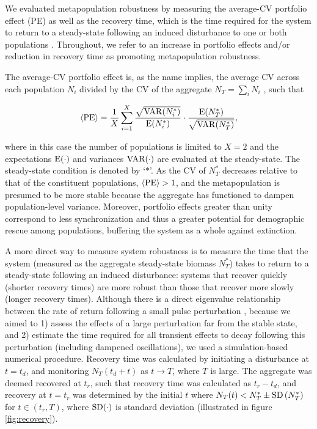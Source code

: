 \documentclass{revtex4}
\begin{document}
\noindent We evaluated metapopulation robustness by measuring the average-CV portfolio effect (PE) \citep{Anderson:2014cx,Schindler:2015gf} as well as the recovery time, which is the time required for the system to return to a steady-state following an induced disturbance to one or both populations \citep{Ovaskainen:2002il}.
Throughout, we refer to an increase in portfolio effects and/or reduction in recovery time as promoting metapopulation robustness.

The average-CV portfolio effect is, as the name implies, the average CV across each population $N_i$ divided by the CV of the aggregate $N_T=\sum_i N_i$ \citep{Anderson:2013gb}, such that

\begin{equation}
\langle{\rm PE}\rangle =\frac{1}{X}\sum_{i=1}^{X} \frac{\sqrt{{\rm VAR}(N_i^*)}}{{\rm E}(N_i^*)}\cdot \frac{{\rm E}(N_T^*)}{\sqrt{{\rm VAR}(N_T^*)}},
\label{eq:pe}
\end{equation}

\noindent where in this case the number of populations is limited to $X=2$ and the expectations $\rm E(\cdot)$ and variances $\rm VAR(\cdot)$ are evaluated at the steady-state.
The steady-state condition is denoted by `$*$'.
As the CV of $N_T^*$ decreases relative to that of the constituent populations, $\langle{\rm PE}\rangle > 1$, and the metapopulation is presumed to be more stable because the aggregate has functioned to dampen population-level variance.
Moreover, portfolio effects greater than unity correspond to less synchronization  \citep{Loreau:2008ju,Anderson:2014cx,Yeakel:2013vz} and thus a greater potential for demographic rescue among populations, buffering the system as a whole against extinction. 

A more direct way to measure system robustness is to measure the time that the system (measured as the aggregate steady-state biomass $N_T^*$) takes to return to a steady-state following an induced disturbance: systems that recover quickly (shorter recovery times) are more robust than those that recover more slowly (longer recovery times).
Although there is a direct eigenvalue relationship between the rate of return following a small pulse perturbation \citep{GuckHolmes}, because we aimed to 
1) assess the effects of a large perturbation far from the stable state, and 
2) estimate the time required for all transient effects to decay following this perturbation (including dampened oscillations), we used a simulation-based numerical procedure.
Recovery time was calculated by initiating a disturbance at $t=t_d$, and monitoring $N_T(t_d+t)$ as $t\rightarrow T$, where $T$ is large. 
The aggregate was deemed recovered at $t_r$, such that recovery time was calculated as $t_r-t_d$, and recovery at $t=t_r$ was determined by the initial $t$ where $N_T(t) < N_T^*\pm{\rm SD}\left( N_T^* \right)$ for $t\in(t_r,T)$, where $\rm{SD}(\cdot)$ is standard deviation (illustrated in figure \ref{fig:recovery}).
\end{document}
